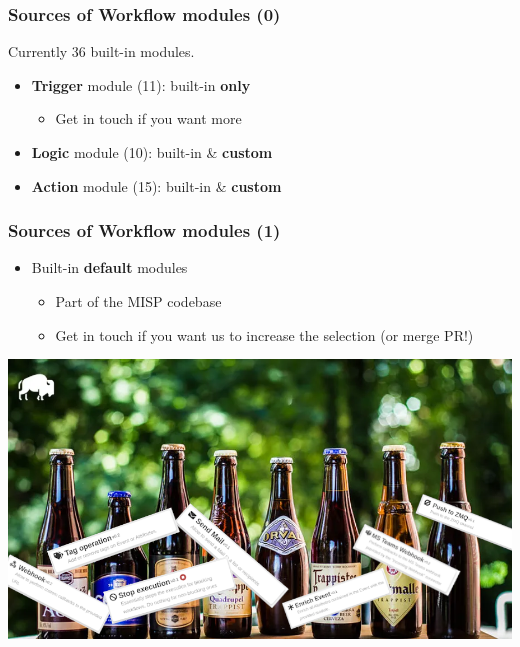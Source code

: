 \begin{frame}
    \frametitle{Sources of Workflow modules (0)}
    Currently 36 built-in modules.
    \vspace{1em}
    \begin{itemize}
        \item \textbf{Trigger} module (11): built-in \textbf{only}
        \begin{itemize}
            \item Get in touch if you want more
        \end{itemize}
        \item \textbf{Logic} module (10): built-in \& \textbf{custom}
        \item \textbf{Action} module (15): built-in \& \textbf{custom}
    \end{itemize}
    \vspace*{2.0em}
\end{frame}

\begin{frame}
    \frametitle{Sources of Workflow modules (1)}
    \begin{itemize}
        \item Built-in \textbf{default} modules
        \begin{itemize}
            \item Part of the MISP codebase
            \item Get in touch if you want us to increase the selection (or merge PR!)
        \end{itemize}
    \end{itemize}
    \vspace*{0.5em}
    \begin{center}
        \includegraphics[width=0.8\linewidth]{pictures/module-buffet.png}
    \end{center}
\end{frame}

